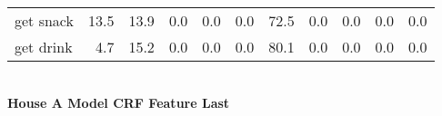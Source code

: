 \documentclass{article}
\begin{document}
\begin{sideways}
\begin{tabular}{lrrrrrrrrrr}
get snack         &        13.5 &               13.9 &               0.0 &                0.0 &                0.0 &             72.5 &                      0.0 &                   0.0 &              0.0 &              0.0 \\
get drink         &         4.7 &               15.2 &               0.0 &                0.0 &                0.0 &             80.1 &                      0.0 &                   0.0 &              0.0 &              0.0 \\
\bottomrule
\end{tabular}
\end{sideways}
\normalsize
\vspace{1cm}\\
\textbf{House A Model CRF Feature Last}\\
\vspace{1cm}\\
\end{document}
